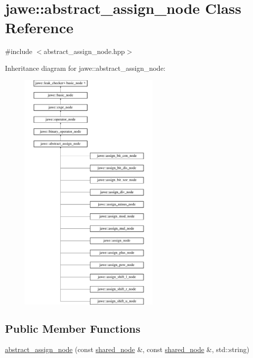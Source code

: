 \hypertarget{classjawe_1_1abstract__assign__node}{}\section{jawe\+:\+:abstract\+\_\+assign\+\_\+node Class Reference}
\label{classjawe_1_1abstract__assign__node}


{\ttfamily \#include $<$abstract\+\_\+assign\+\_\+node.\+hpp$>$}

Inheritance diagram for jawe\+:\+:abstract\+\_\+assign\+\_\+node\+:\begin{figure}[H]
\begin{center}
\leavevmode
\includegraphics[height=12.000000cm]{classjawe_1_1abstract__assign__node}
\end{center}
\end{figure}
\subsection*{Public Member Functions}
\begin{DoxyCompactItemize}
\item 
\hyperlink{classjawe_1_1abstract__assign__node_ace18ba77e7a0d85b3b9c475062a8fec0}{abstract\+\_\+assign\+\_\+node} (const \hyperlink{namespacejawe_a3f307481d921b6cbb50cc8511fc2b544}{shared\+\_\+node} \&, const \hyperlink{namespacejawe_a3f307481d921b6cbb50cc8511fc2b544}{shared\+\_\+node} \&, std\+::string)
\end{DoxyCompactItemize}
